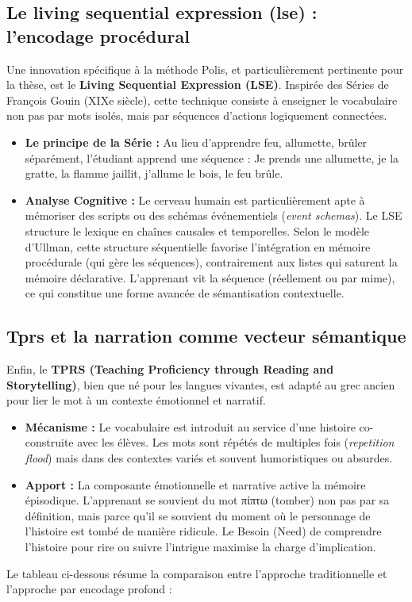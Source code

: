 \subsection{Le living sequential expression (lse) : l'encodage procédural}

Une innovation spécifique à la méthode Polis, et particulièrement pertinente pour la thèse, est le
\textbf{Living Sequential Expression (LSE)}. Inspirée des \og Séries\fg{} de François Gouin (XIXe
siècle), cette technique consiste à enseigner le vocabulaire non pas par mots isolés, mais par
séquences d'actions logiquement connectées.\cite{III-1-3-ref50}

\begin{itemize}\item \textbf{Le principe de la Série :} Au lieu d'apprendre \og feu\fg{}, \og allumette\fg{}, \og brûler\fg{} séparément, l'étudiant apprend une séquence : \og Je prends une allumette, je la gratte, la flamme jaillit, j'allume le bois, le feu brûle\fg{}.\item \textbf{Analyse Cognitive :} Le cerveau humain est particulièrement apte à mémoriser des scripts ou des schémas événementiels (\textit{event schemas}). Le LSE structure le lexique en chaînes causales et temporelles. Selon le modèle d'Ullman, cette structure séquentielle favorise l'intégration en mémoire procédurale (qui gère les séquences), contrairement aux listes qui saturent la mémoire déclarative.\cite{III-1-3-ref47} L'apprenant \og vit\fg{} la séquence (réellement ou par mime), ce qui constitue une forme avancée de sémantisation contextuelle.\end{itemize}

\subsection{Tprs et la narration comme vecteur sémantique}

Enfin, le \textbf{TPRS (Teaching Proficiency through Reading and Storytelling)}, bien que né pour
les langues vivantes, est adapté au grec ancien pour lier le mot à un contexte émotionnel et
narratif.

\begin{itemize}\item \textbf{Mécanisme :} Le vocabulaire est introduit au service d'une histoire co-construite avec les élèves. Les mots sont répétés de multiples fois (\textit{repetition flood}) mais dans des contextes variés et souvent humoristiques ou absurdes.\item \textbf{Apport :} La composante émotionnelle et narrative active la mémoire épisodique. L'apprenant se souvient du mot πίπτω (tomber) non pas par sa définition, mais parce qu'il se souvient du moment où le personnage de l'histoire est tombé de manière ridicule. Le \og Besoin\fg{} (Need) de comprendre l'histoire pour rire ou suivre l'intrigue maximise la charge d'implication.\cite{III-1-3-ref47}\end{itemize}Le tableau ci-dessous résume la comparaison entre l'approche traditionnelle et l'approche par
encodage profond :

